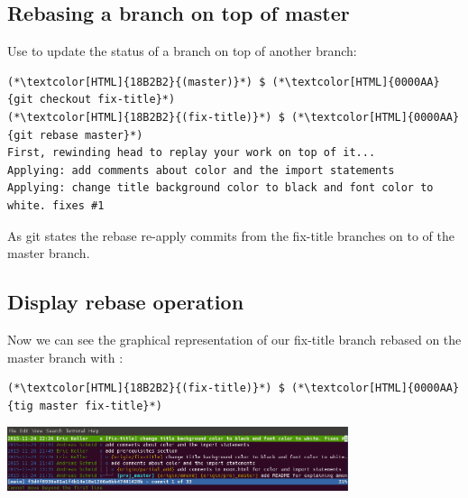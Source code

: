 \subsection{Rebasing a branch on top of master}
\begin{frame}[fragile]
  \subslidetitle

  Use  to update the status of a branch on top of another branch:

  \begin{lstlisting}
(*\textcolor[HTML]{18B2B2}{(master)}*) $ (*\textcolor[HTML]{0000AA}{git checkout fix-title}*)
(*\textcolor[HTML]{18B2B2}{(fix-title)}*) $ (*\textcolor[HTML]{0000AA}{git rebase master}*)
First, rewinding head to replay your work on top of it...
Applying: add comments about color and the import statements
Applying: change title background color to black and font color to white. fixes #1
\end{lstlisting}

  As git states the rebase re-apply commits from the fix-title branches on to of the master branch.

\end{frame}

\subsection{Display rebase operation}
\begin{frame}[fragile]
  \subslidetitle

  Now we can see the graphical representation of our fix-title branch rebased on the master branch with :
  \begin{lstlisting}
(*\textcolor[HTML]{18B2B2}{(fix-title)}*) $ (*\textcolor[HTML]{0000AA}{tig master fix-title}*)
\end{lstlisting}

  \vspace{1em}

  \centerline{\includegraphics[width=10cm]{../screen/tig-fix-title-rebase-master.png}}

\end{frame}

